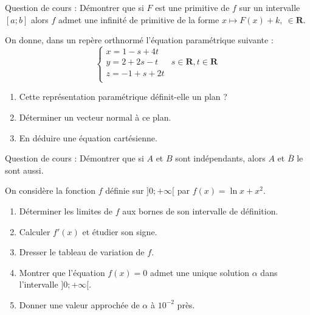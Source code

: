\begin{question}[topic=intégrale]
  Question de cours : Démontrer que si $F$ est une primitive de $f$ sur un
  intervalle $[a;b]$ alors $f$ admet une infinité de primitive de la forme
  $x\mapsto F(x) + k,\ \in\mathbf{R}$.
\end{question}

\begin{question}[topic=géométrie]
  On donne, dans un repère orthnormé l'équation paramétrique suivante :
  \[ \left\lbrace \begin{array}{lr}
      x = 1 - s + 4t &                                 \\
      y = 2 + 2s -t  & s\in\mathbf{R}, t\in \mathbf{R} \\
      z = -1 +s + 2t &                                 \\
  \end{array}\right.\]

  \begin{enumerate}
    \item Cette représentation paramétrique définit-elle un plan ?
    \item Déterminer un vecteur normal à ce plan.
    \item En déduire une équation cartésienne.
  \end{enumerate}
\end{question}

\begin{question}[topic=probabilités]
  Question de cours : Démontrer que si $A$ et $B$ sont indépendants, alors
  $A$ et $\overline{B}$ le sont aussi.
\end{question}

\begin{question}[topic=fonction]
  On considère la fonction $f$ définie sur $]0;+\infty[$ par $f(x) = \ln x
  + x^2$.

  \begin{enumerate}
    \item Déterminer les limites de $f$ aux bornes de son intervalle de
      définition.
    \item Calculer $f'(x)$ et étudier son signe.
    \item Dresser le tableau de variation de $f$.
    \item Montrer que l'équation $f(x) = 0$ admet une unique solution
      $\alpha$ dans l'intervalle $]0;+\infty[$.
    \item Donner une valeur approchée de $\alpha$ à $10^{-2}$ près.
  \end{enumerate}
\end{question}

